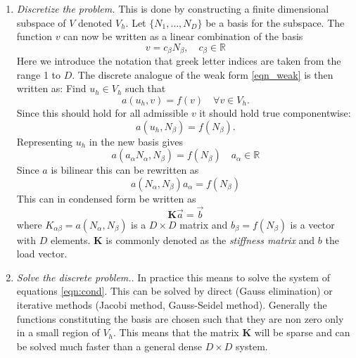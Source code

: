 \documentclass[fem.tex]{subfiles}
\begin{document}
\begin{enumerate}
\item \emph{Discretize the problem.} This is done by constructing a finite dimensional subspace of $V$ denoted $V_h$. Let $\{N_1, \ldots, N_D \}$  be a basis for the subspace. The function $v$ can now be written as a linear combination of the basis
%
\begin{equation} 
v =  c_\beta N_\beta, \quad c_\beta \in \mathbb{R} 
\end{equation}
%
Here we introduce the notation that greek letter indices are taken from the range 1 to $D$. The discrete analogue of the weak form \ref{eqn_weak} 
is then written as: Find $u_h \in V_h$ such that
%
\begin{equation} 
\label{eqn_disc_analo}
  a(u_h,v) = f(v) \quad \forall v \in V_h.
\end{equation}
Since this should hold for all admissible $v$ it should hold true componentwise:
\begin{equation} 
    a(u_h, N_\beta) = f(N_\beta).
    \label{eqn:disc_part}
\end{equation}
%
Representing $u_h$ in the new basis gives
\begin{equation} 
    a \left(a_\alpha N_\alpha, N_\beta \right) = f(N_\beta ) \quad a_\alpha \in \mathbb{R}
    \label{eqn:u_new_base}
\end{equation}
%
Since $a$ is bilinear this can be rewritten as 
\begin{equation} 
    a \left( N_\alpha, N_\beta \right)a_\alpha = f(N_\beta)
    \label{eqn:final}
\end{equation}
%
This can in condensed form be written as
\begin{equation} 
    \mathbf{K} \vec{a} = \vec{b}
    \label{eqn:cond}
\end{equation}
where $K_{\alpha \beta} = a(N_\alpha, N_\beta)$ is a $D \times D$ matrix and $b_\beta = f(N_\beta)$ is a vector with $D$ elements. $\mathbf{K}$ is commonly denoted as the \textit{stiffness matrix} and $b$ the load vector.


\item \textit{Solve the discrete problem.}. In practice this means to solve the system of equations \ref{eqn:cond}. This can be solved by direct (Gauss elimination) or iterative methods (Jacobi method, Gauss-Seidel method). Generally the functions constituting the basis are chosen such that they are non zero only in a small region of $V_h$. This means that the matrix $\mathbf{K}$ will be sparse and can be solved much faster than a general dense $D \times D$ system.

\end{enumerate}
\end{document}
